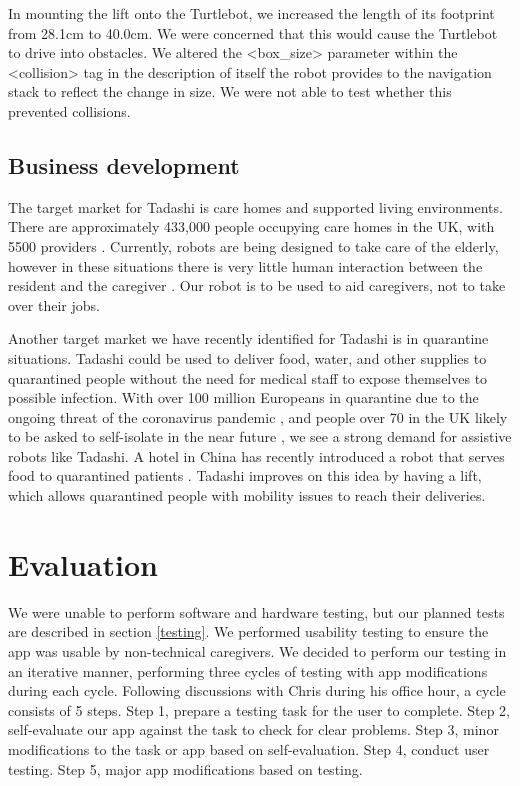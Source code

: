 \documentclass{article}
\begin{document}
In mounting the lift onto the Turtlebot, we increased the length of its footprint from 28.1cm to 40.0cm. We were concerned that this would cause the Turtlebot to drive into obstacles. We altered the <box\_size> parameter within the <collision> tag in the description of itself the robot provides to the navigation stack to reflect the change in size. We were not able to test whether this prevented collisions.


\subsection{Business development}
The target market for Tadashi is care homes and supported living environments. There are approximately 433,000 people occupying care homes in the UK, with 5500 providers \cite{carehomes}. Currently, robots are being designed to take care of the elderly, however in these situations there is very little human interaction between the resident and the caregiver \cite{robotcarers}. Our robot is to be used to aid caregivers, not to take over their jobs.

Another target market we have recently identified for Tadashi is in quarantine situations. Tadashi could be used to deliver food, water, and other supplies to quarantined people without the need for medical staff to expose themselves to possible infection. With over 100 million Europeans in quarantine due to the ongoing threat of the coronavirus pandemic \cite{quarantine}, and people over 70 in the UK likely to be asked to self-isolate in the near future \cite{isolate}, we see a strong demand for assistive robots like Tadashi. A hotel in China has recently introduced a robot that serves food to quarantined patients \cite{peanut}. Tadashi improves on this idea by having a lift, which allows quarantined people with mobility issues to reach their deliveries.

\section{Evaluation}
We were unable to perform software and hardware testing, but our planned tests are described in section \ref{testing}. 
We performed usability testing to ensure the app was usable by non-technical caregivers. We decided to perform our testing in an iterative manner, performing three cycles of testing with app modifications during each cycle. Following discussions with Chris during his office hour, a cycle consists of 5 steps.
Step 1, prepare a testing task for the user to complete.
Step 2, self-evaluate our app against the task to check for clear problems.
Step 3, minor modifications to the task or app based on self-evaluation.
Step 4, conduct user testing.
Step 5, major app modifications based on testing.
\end{document}
